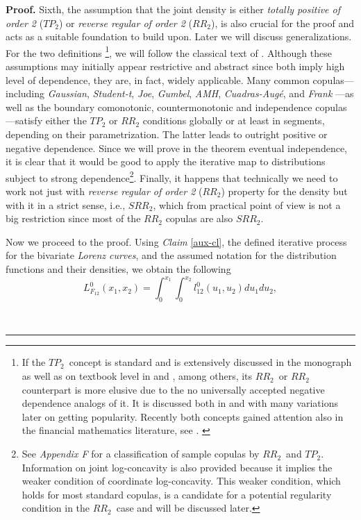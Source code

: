 \documentclass[onecolumn]{article}
\providecommand{\dint}{\displaystyle\int}
\newenvironment{proof}[1][Proof]{\noindent\textbf{#1.} }{\ \rule{0.5em}{0.5em}}
\renewcommand{\dint}{\displaystyle\int}
\begin{document}
\begin{proof}
Sixth, the assumption that the joint density is either \textit{totally
positive of order 2} ($TP_{2}$) or \textit{reverse regular of order 2} ($%
RR_{2}$), is also crucial for the proof and acts as a suitable foundation to
build upon. Later we will discuss generalizations. For the two definitions%
\footnote{{\footnotesize If the }$TP_{2}${\footnotesize \ concept is
standard and is extensively discussed in the monograph \cite{[36]} as well
as on textbook level in \cite{[38]} and \cite{[24]}, among others, its }$%
RR_{2}${\footnotesize \ }or $RR_{2}$ {\footnotesize counterpart is more
elusive due to the no universally accepted negative dependence analogs of
it. It is discussed both in \cite[page 12]{[36]} and \cite{[32]} with many
variations later on getting popularity. Recently both concepts gained
attention also in the financial mathematics literature, see \cite{[37]}. }},
we will follow the classical text of \cite{[36]}. Although these assumptions
may initially appear restrictive and abstract since both imply high level of
dependence, they are, in fact, widely applicable. Many common
copulas---including \textit{Gaussian}, \textit{Student-t}, \textit{Joe}, 
\textit{Gumbel}, \textit{AMH}, \textit{Cuadras-Aug\'{e}}, and \textit{Frank}%
---as well as the boundary comonotonic, countermonotonic and independence
copulas---satisfy either the $TP_{2}$ or $RR_{2}$ conditions globally or at
least in segments, depending on their parametrization. The latter leads to
outright positive or negative dependence. Since we will prove in the theorem
eventual independence, it is clear that it would be good to apply the
iterative map to distributions subject to strong dependence\footnote{%
{\footnotesize See \textit{Appendix F} for a classification of sample
copulas by }$RR_{2}${\footnotesize \ and }$TP_{2}${\footnotesize .
Information on joint log-concavity is also provided because it implies the
weaker condition of coordinate log-concavity. This weaker condition, which
holds for most standard copulas, is a candidate for a potential regularity
condition in the }$RR_{2}${\footnotesize \ case and will be discussed later.}%
}. Finally, it happens that technically we need to work not just with 
\textit{reverse regular of order 2} ($RR_{2}$) property for the density but
with it in a strict sense, i.e., $SRR_{2}$, which from practical point of
view is not a big restriction since most of the $RR_{2}$ copulas are also $%
SRR_{2}$.

Now we proceed to the proof. Using \textit{Claim }\ref{aux-cl}, the defined
iterative process for the bivariate \textit{Lorenz curves}, and the assumed
notation for the distribution functions and their densities, we obtain the
following%
\begin{equation}
L_{F_{12}}^{0}(x_{1},x_{2})=\dint\nolimits_{0}^{x_{1}}\dint%
\nolimits_{0}^{x_{2}}l_{12}^{0}(u_{1},u_{2})du_{1}du_{2},  \label{7}
\end{equation}


\end{proof}
\end{document}
